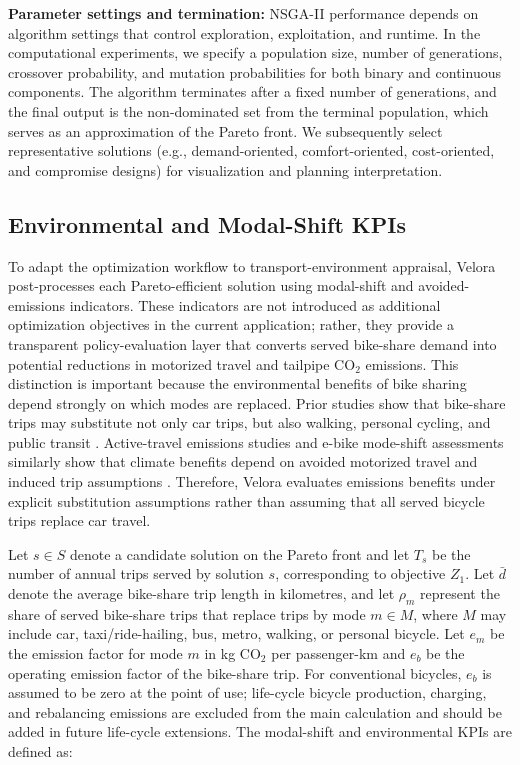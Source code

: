 \documentclass[preprint,authoryear,10pt]{elsarticle}
\begin{document}
\textbf{Parameter settings and termination:} NSGA-II performance depends on algorithm settings that control exploration, exploitation, and runtime. In the computational experiments, we specify a population size, number of generations, crossover probability, and mutation probabilities for both binary and continuous components. The algorithm terminates after a fixed number of generations, and the final output is the non-dominated set from the terminal population, which serves as an approximation of the Pareto front. We subsequently select representative solutions (e.g., demand-oriented, comfort-oriented, cost-oriented, and compromise designs) for visualization and planning interpretation.

\subsection{Environmental and Modal-Shift KPIs}\label{subsec:environmental_kpis}

To adapt the optimization workflow to transport-environment appraisal, Velora post-processes each Pareto-efficient solution using modal-shift and avoided-emissions indicators. These indicators are not introduced as additional optimization objectives in the current application; rather, they provide a transparent policy-evaluation layer that converts served bike-share demand into potential reductions in motorized travel and tailpipe CO$_2$ emissions. This distinction is important because the environmental benefits of bike sharing depend strongly on which modes are replaced. Prior studies show that bike-share trips may substitute not only car trips, but also walking, personal cycling, and public transit \citep{fuller2013potential, RICCI201528, saltykova2022environmental}. Active-travel emissions studies and e-bike mode-shift assessments similarly show that climate benefits depend on avoided motorized travel and induced trip assumptions \citep{BRAND2021102764, MCQUEEN2020102482}. Therefore, Velora evaluates emissions benefits under explicit substitution assumptions rather than assuming that all served bicycle trips replace car travel.

Let $s\in S$ denote a candidate solution on the Pareto front and let $T_s$ be the number of annual trips served by solution $s$, corresponding to objective $Z_1$. Let $\bar{d}$ denote the average bike-share trip length in kilometres, and let $\rho_m$ represent the share of served bike-share trips that replace trips by mode $m\in M$, where $M$ may include car, taxi/ride-hailing, bus, metro, walking, or personal bicycle. Let $e_m$ be the emission factor for mode $m$ in kg CO$_2$ per passenger-km and $e_b$ be the operating emission factor of the bike-share trip. For conventional bicycles, $e_b$ is assumed to be zero at the point of use; life-cycle bicycle production, charging, and rebalancing emissions are excluded from the main calculation and should be added in future life-cycle extensions. The modal-shift and environmental KPIs are defined as:
\end{document}
